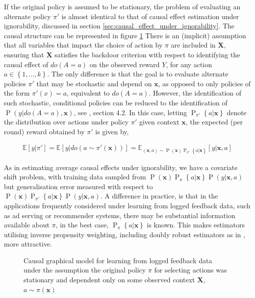 \documentclass[11pt,a4paper,oneside]{book}
\newcommand{\Pns}[2]{\operatorname{P}_{#1}\left\{#2\right\}}
\newcommand{\Esub}[2]{\mathbb E_{#1}\left[{#2}\right]}
\newcommand{\E}[1]{\mathbb E\left[{#1}\right]}
\newcommand{\set}[1]{\left\{#1\right\}}
\newcommand{\eqn}[1]{\begin{align}#1\end{align}}
\renewcommand{\P}[1]{\operatorname{P}\left(#1\right)}
\renewcommand{\vec}[1]{\boldsymbol{#1}}
\theoremstyle{plain}
\theoremstyle{definition}
\begin{document}
If the original policy is assumed to be stationary, the problem of evaluating an alternate policy $\pi'$ is almost identical to that of causal effect estimation under ignorability, discussed in section \ref{sec:causal_effect_under_ignorability}. The causal structure can be represented in figure \ref{fig:off-policy-evaluation} There is an (implicit) assumption that all variables that impact the choice of action by $\pi$ are included in $\vec{X}$, ensuring that $\vec{X}$ satisfies the backdoor criterion with respect to identifying the causal effect of $do(A = a)$ on the observed reward $Y$, for any action $a \in \set{1,...,k}$. The only difference is that the goal is to evaluate alternate policies $\pi'$ that may be stochastic and depend on $\vec{x}$, as opposed to only policies of the form $\pi'(x) = a$, equivalent to $do(A=a)$. However, the identification of such stochastic, conditional policies can be reduced to the identification of $\P{y|do(A=a),\vec{x}}$, see \citet{Pearl2000}, section 4.2. In this case, letting $\Pns{\pi'}{a|\vec{x}}$ denote the distribution over actions under policy $\pi'$ given context $\vec{x}$, the expected (per round) reward obtained by $\pi'$ is given by,

\eqn{
\E{y|\pi'} = \E{y|do(a \sim \pi'(\vec{x}))} = \Esub{(\vec{x},a) \sim \P{\vec{x}}\Pns{\pi'}{a|\vec{x}}}{y|\vec{x},a}
}

As in estimating average causal effects under ignorability, we have a covariate shift problem, with training data sampled from $\P{\vec{x}}\Pns{\pi}{a|\vec{x}}\P{y|\vec{x},a}$ but generalisation error measured with respect to $\P{\vec{x}}\Pns{\pi'}{a|\vec{x}}\P{y|\vec{x},a}$. A difference in practice, is that in the applications frequently considered under learning from logged feedback data, such as ad serving or recommender systems, there may be substantial information available about $\pi$, in the best case, $\Pns{\pi}{a|\vec{x}}$ is known. This makes estimators utilising inverse propensity weighting, including doubly robust estimators as in \citet{Dudik2011}, more attractive. 

\begin{figure}
\centering
{} 
\caption{Causal graphical model for learning from logged feedback data under the assumption the original policy $\pi$ for selecting actions was stationary and dependent only on some observed context $\vec{X}$, $a \sim \pi(\vec{x})$}
\label{fig:off-policy-evaluation}
\end{figure}
\end{document}
